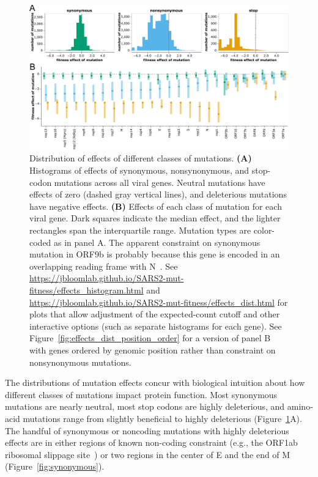 \documentclass[9pt,twocolumn,twoside]{gsajnl_modified}
\begin{document}
\begin{figure}
\includegraphics[width=\linewidth]{figs/dist.pdf}
\caption{
Distribution of effects of different classes of mutations.
{\bf (A)}
Histograms of effects of synonymous, nonsynonymous, and stop-codon mutations across all viral genes.
Neutral mutations have effects of zero (dashed gray vertical lines), and deleterious mutations have negative effects.
{\bf (B)}
Effects of each class of mutation for each viral gene.
Dark squares indicate the median effect, and the lighter rectangles span the interquartile range.
Mutation types are color-coded as in panel A.
The apparent constraint on synonymous mutation in ORF9b is probably because this gene is encoded in an overlapping reading frame with N~\cite{jungreis2021conflicting}.
See \url{https://jbloomlab.github.io/SARS2-mut-fitness/effects_histogram.html} and \url{https://jbloomlab.github.io/SARS2-mut-fitness/effects_dist.html} for plots that allow adjustment of the expected-count cutoff and other interactive options (such as separate histograms for each gene).
See Figure~\ref{fig:effects_dist_position_order} for a version of panel B with genes ordered by genomic position rather than constraint on nonsynonymous mutations.
\label{fig:dist}
}
\end{figure}

The distributions of mutation effects concur with biological intuition about how different classes of mutations impact protein function.
Most synonymous mutations are nearly neutral, most stop codons are highly deleterious, and amino-acid mutations range from slightly beneficial to highly deleterious (Figure~\ref{fig:dist}A).
The handful of synonymous or noncoding mutations with highly deleterious effects are in either regions of known non-coding constraint (e.g., the ORF1ab ribosomal slippage site~\cite{bhatt2021structural}) or two regions in the center of E and the end of M (Figure~\ref{fig:synonymous}).
\end{document}
